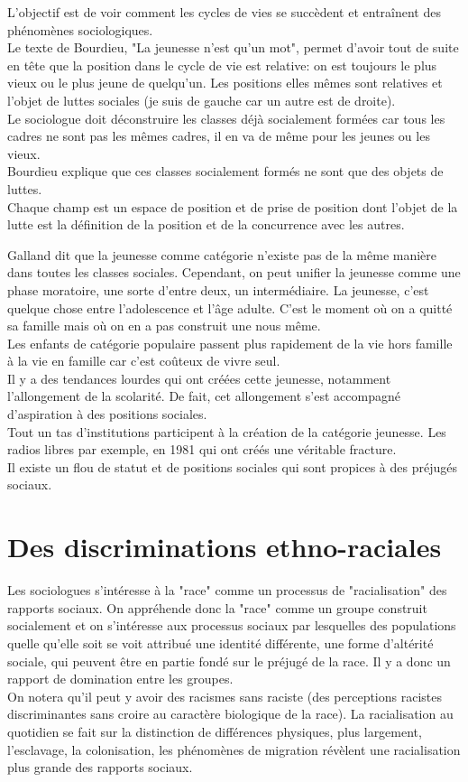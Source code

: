 \documentclass[12pt, a4paper, openany]{book}
\begin{document}
L'objectif est de voir comment les cycles de vies se succèdent et entraînent des phénomènes sociologiques. \\
Le texte de Bourdieu, "La jeunesse n'est qu'un mot", permet d'avoir tout de suite en tête que la position dans le cycle de vie est relative: on est toujours le plus vieux ou le plus jeune de quelqu'un. Les positions elles mêmes sont relatives et l'objet de luttes sociales (je suis de gauche car un autre est de droite). \\
Le sociologue doit déconstruire les classes déjà socialement formées car tous les cadres ne sont pas les mêmes cadres, il en va de même pour les jeunes ou les vieux. \\
Bourdieu explique que ces classes socialement formés ne sont que des objets de luttes. \\
Chaque champ est un espace de position et de prise de position dont l'objet de la lutte est la définition de la position et de la concurrence avec les autres.  


Galland dit que la jeunesse comme catégorie n'existe pas de la même manière dans toutes les classes sociales. Cependant, on peut unifier la jeunesse comme une phase moratoire, une sorte d'entre deux, un intermédiaire. La jeunesse, c'est quelque chose entre l'adolescence et l'âge adulte. C'est le moment où on a quitté sa famille mais où on en a pas construit une nous même. \\
Les enfants de catégorie populaire passent plus rapidement de la vie hors famille à la vie en famille car c'est coûteux de vivre seul. \\
Il y a des tendances lourdes qui ont créées cette jeunesse, notamment l'allongement de la scolarité. De fait, cet allongement s'est accompagné d'aspiration à des positions sociales. \\
Tout un tas d'institutions participent à la création de la catégorie jeunesse. Les radios libres par exemple, en 1981 qui ont créés une véritable fracture. \\
Il existe un flou de statut et de positions sociales qui sont propices à des préjugés sociaux. 



\chapter{Des discriminations ethno-raciales}

Les sociologues s'intéresse à la "race" comme un processus de "racialisation" des rapports sociaux. On appréhende donc la "race" comme un groupe construit socialement et on s'intéresse aux processus sociaux par lesquelles des populations quelle qu'elle soit se voit attribué une identité différente, une forme d'altérité sociale, qui peuvent être en partie fondé sur le préjugé de la race. Il y a donc un rapport de domination entre les groupes. \\
On notera qu'il peut y avoir des racismes sans raciste (des perceptions racistes discriminantes sans croire au caractère biologique de la race). La racialisation au quotidien se fait sur la distinction de différences physiques, plus largement, l'esclavage, la colonisation, les phénomènes de migration révèlent une racialisation plus grande des rapports sociaux. 
\end{document}
